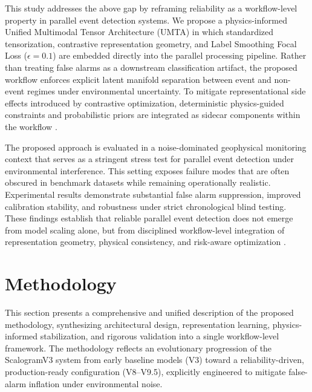 \documentclass[a4paper,fleqn]{cas-sc}
\begin{document}
This study addresses the above gap by reframing reliability as a workflow-level property in parallel event detection systems. We propose a physics-informed Unified Multimodal Tensor Architecture (UMTA) in which standardized tensorization, contrastive representation geometry, and Label Smoothing Focal Loss ($\epsilon=0.1$)  are embedded directly into the parallel processing pipeline. Rather than treating false alarms as a downstream classification artifact, the proposed workflow enforces explicit latent manifold separation between event and non-event regimes under environmental uncertainty. To mitigate representational side effects introduced by contrastive optimization, deterministic physics-guided constraints and probabilistic priors are integrated as sidecar components within the workflow \cite{Ouyang2023Parallel,Park2025JASA}.

The proposed approach is evaluated in a noise-dominated geophysical monitoring context that serves as a stringent stress test for parallel event detection under environmental interference. This setting exposes failure modes that are often obscured in benchmark datasets while remaining operationally realistic. Experimental results demonstrate substantial false alarm suppression, improved calibration stability, and robustness under strict chronological blind testing. These findings establish that reliable parallel event detection does not emerge from model scaling alone, but from disciplined workflow-level integration of representation geometry, physical consistency, and risk-aware optimization \cite{Ganguly2024JPDC,Strem2025RESS}.

\section{Methodology}

This section presents a comprehensive and unified description of the proposed methodology, synthesizing architectural design, representation learning, physics-informed stabilization, and rigorous validation into a single workflow-level framework. The methodology reflects an evolutionary progression of the ScalogramV3 system from early baseline models (V3) toward a reliability-driven, production-ready configuration (V8–V9.5), explicitly engineered to mitigate false-alarm inflation under environmental noise.

\end{document}
